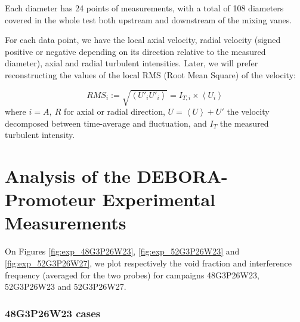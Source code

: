 \npar



Each diameter has 24 points of measurements, with a total of 108 diameters covered in the whole test both upstream and downstream of the mixing vanes. 

\npar

For each data point, we have the local axial velocity, radial velocity (signed positive or negative depending on its direction relative to the measured diameter), axial and radial turbulent intensities. Later, we will prefer reconstructing the values of the local RMS (Root Mean Square) of the velocity:

\begin{equation}
RMS_{i} := \sqrt{\left<U'_{i}U'_{i}\right>} = I_{T,i} \times \left<U_{i}\right>
\label{eq:RMS_def}
\end{equation}
where $i=A,\ R$ for axial or radial direction, $U=\left<U\right> + U'$ the velocity decomposed between time-average and fluctuation, and $I_{T}$ the measured turbulent intensity. 




\section{Analysis of the DEBORA-Promoteur Experimental Measurements}
\label{sec:deb_prom_anal}

On Figures \ref{fig:exp_48G3P26W23}, \ref{fig:exp_52G3P26W23} and \ref{fig:exp_52G3P26W27}, we plot respectively the void fraction and interference frequency (averaged for the two probes) for campaigns 48G3P26W23, 52G3P26W23 and 52G3P26W27.



\subsubsection{48G3P26W23 cases}


